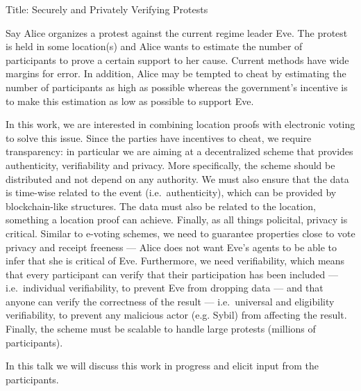 Title: Securely and Privately Verifying Protests                                  
                                                                    
Say Alice organizes a protest against the current regime leader Eve.
The protest is held in some location(s) and Alice wants to estimate the number 
of participants to prove a certain support to her cause.
Current methods have wide margins for error.
In addition, Alice may be tempted to cheat by estimating the number of 
participants as high as possible whereas the government's incentive is to make 
this estimation as low as possible to support Eve.
                                                                                  
In this work, we are interested in combining location proofs with electronic 
voting to solve this issue.
Since the parties have incentives to cheat, we require transparency: in 
particular we are aiming at a decentralized scheme that provides authenticity, 
verifiability and privacy.
More specifically, the scheme should be distributed and not depend on any 
authority.
We must also ensure that the data is time-wise related to the event (i.e.\ 
authenticity), which can be provided by blockchain-like structures.
The data must also be related to the location, something a location proof can 
achieve.
Finally, as all things policital, privacy is critical.
Similar to e-voting schemes, we need to guarantee properties close to vote 
privacy and receipt freeness --- Alice does not want Eve's agents to be able to 
infer that she is critical of Eve.
Furthermore, we need verifiability, which means that every participant can 
verify that their participation has been included --- i.e.\ individual 
verifiability, to prevent Eve from dropping data --- and that anyone
can verify the correctness of the result --- i.e.\ universal and eligibility
verifiability, to prevent any malicious actor (e.g. Sybil) from affecting the 
result.
Finally, the scheme must be scalable to handle large protests (millions of 
participants).

In this talk we will discuss this work in progress and elicit input from the
participants.

